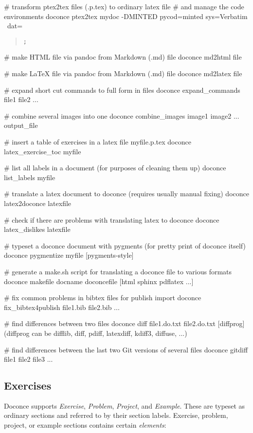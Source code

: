 \documentclass[%
oneside,                 %
final,                   %
10pt]{article}
\begin{document}
# transform ptex2tex files (.p.tex) to ordinary latex file
# and manage the code environments
doconce ptex2tex mydoc -DMINTED pycod=minted sys=Verbatim \
        dat=\begin{quote}\begin{verbatim};\end{verbatim}\end{quote}

# make HTML file via pandoc from Markdown (.md) file
doconce md2html file

# make LaTeX file via pandoc from Markdown (.md) file
doconce md2latex file

# expand short cut commands to full form in files
doconce expand_commands file1 file2 ...

# combine several images into one
doconce combine_images image1 image2 ... output_file

# insert a table of exercises in a latex file myfile.p.tex
doconce latex_exercise_toc myfile

# list all labels in a document (for purposes of cleaning them up)
doconce list_labels myfile

# translate a latex document to doconce (requires usually manual fixing)
doconce latex2doconce latexfile

# check if there are problems with translating latex to doconce
doconce latex_dislikes latexfile

# typeset a doconce document with pygments (for pretty print of doconce itself)
doconce pygmentize myfile [pygments-style]

# generate a make.sh script for translating a doconce file to various formats
doconce makefile docname doconcefile [html sphinx pdflatex ...]

# fix common problems in bibtex files for publish import
doconce fix_bibtex4publish file1.bib file2.bib ...

# find differences between two files
doconce diff file1.do.txt file2.do.txt [diffprog]
(diffprog can be difflib, diff, pdiff, latexdiff, kdiff3, diffuse, ...)

# find differences between the last two Git versions of several files
doconce gitdiff file1 file2 file3 ...
\eshpro

\subsection{Exercises}

Doconce supports \emph{Exercise}, \emph{Problem}, \emph{Project}, and \emph{Example}.
These are typeset
as ordinary sections and referred to by their section labels.
Exercise, problem, project, or example sections contains certain \emph{elements}:
\end{document}
